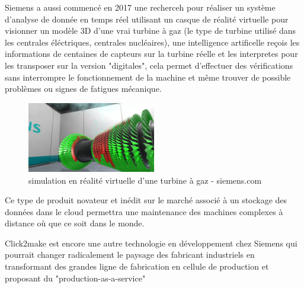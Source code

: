 Siemens a aussi commencé en 2017 une recherceh pour réaliser un système d'analyse 
de donnée en temps réel utilisant un casque de réalité virtuelle pour visionner 
un modèle 3D d'une vrai turbine à gaz (le type de turbine utilisé dans les 
centrales éléctriques, centrales nucléaires), une intelligence artificelle reçois les 
informations de centaines de capteurs sur la turbine réelle et les interpretes
pour les transposer sur la version "digitales", cela permet d'effectuer
des vérifications sans interrompre le fonctionnement de la machine 
et même trouver de possible problèmes ou signes de fatigues mécanique. \newline

\begin{figure}[H]
    \centering
    \includegraphics[width=0.5\textwidth]{Images/turbine}
    \caption{simulation en réalité virtuelle d'une turbine à gaz - siemens.com}
	\label{fig:gasturbine}
\end{figure}

Ce type de produit novateur et inédit sur le marché associé à 
un stockage des données dans le cloud permettra une maintenance 
des machines complexes à distance où que ce soit dans le monde. \newline 

Click2make est encore une autre technologie en développement chez Siemens 
qui pourrait changer radicalement le paysage des fabricant industriels
en transformant des grandes ligne de fabrication en cellule de production 
et proposant du "production-as-a-service"



